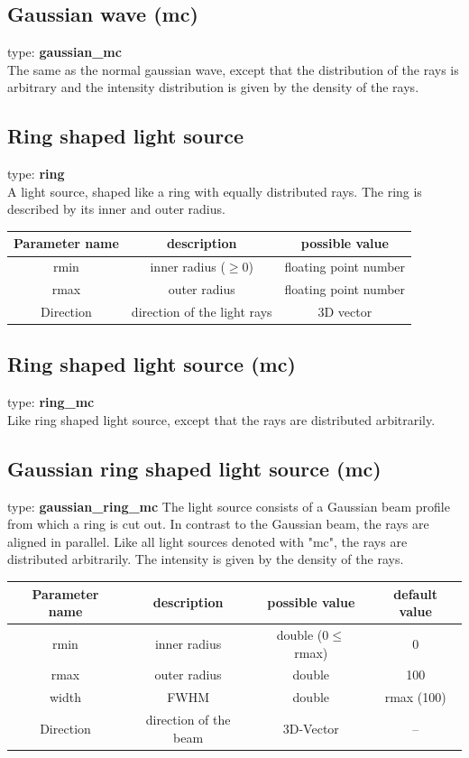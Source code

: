 \documentclass[a4paper,html,11pt,openany]{book}
\begin{document}
\subsection{Gaussian wave (mc)} 
 type: \textbf{gaussian\_mc} \\
The same as the normal gaussian wave, except that the distribution of the rays is arbitrary and the intensity distribution is given by the density of the rays. 

\subsection{Ring shaped light source}
type: \textbf{ring} \\
A light source, shaped like a ring with equally distributed rays. The ring is described by its inner and outer radius. 

\vspace{1em}
 \begin{tabular}{c|c|c}
 Parameter name & description  & possible value \\
 \hline
  rmin & inner radius ($\ge 0$) & floating point number \\
  \hline
  rmax & outer radius  & floating point number \\
  \hline 
  Direction & direction of the light rays & 3D vector
\end{tabular} 
 
\subsection{Ring shaped light source (mc)}
 type: \textbf{ring\_mc} \\
Like ring shaped light source, except that the rays are distributed arbitrarily. 
 \subsection{Gaussian ring shaped light source (mc)}
type: \textbf{gaussian\_ring\_mc}
The light source consists of a Gaussian beam profile from which a ring is cut out. In contrast to the Gaussian beam, the rays are aligned in parallel.
Like all light sources denoted with "mc", the rays are distributed arbitrarily. The intensity is given by the density of the rays. 

\vspace{1em}
 \begin{tabular}{c|c|c|c}
 Parameter name & description  & possible value & default value\\
 \hline
 rmin  & inner radius & double ($0\le$ rmax) & 0 \\
 \hline 
 rmax & outer radius & double & 100 \\
 \hline 
 width & FWHM & double & rmax (100) \\
 Direction & direction of the beam & 3D-Vector & -- \\ 
\end{tabular}
 
\end{document}
